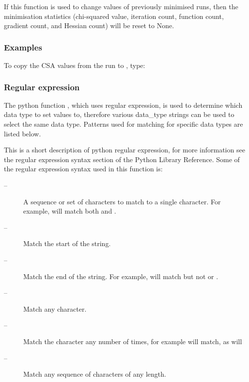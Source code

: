 If this function is used to change values of previously minimised runs, then the minimisation statistics (chi-squared value, iteration count, function count, gradient count, and Hessian count) will be reset to None.



\subsubsection{Examples}

To copy the CSA values from the run  to , type:




\subsubsection{Regular expression}

The python function , which uses regular expression, is used to determine which data type to set values to, therefore various data\_type strings can be used to select the same data type.  Patterns used for matching for specific data types are listed below.


This is a short description of python regular expression, for more information see the regular expression syntax section of the Python Library Reference.  Some of the regular expression syntax used in this function is:


\begin{description}
\item[\quotecmd{[]} --]  A sequence or set of characters to match to a single character.  For example,  will match both  and . 
\item[\quotecmd{\^{}} --]  Match the start of the string. 
\item[\quotecmd{\$} --]  Match the end of the string.  For example,  will match  but not  or . 
\item[ --]  Match any character. 
\item[ --]  Match the character  any number of times, for example  will match, as will  
\item[ --]  Match any sequence of characters of any length. 
\end{description}


